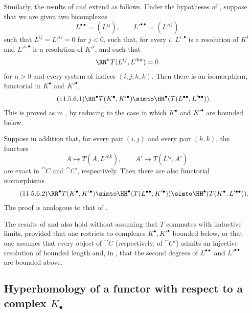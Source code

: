 \begin{env}[11.5.6]
\label{0.11.5.6}
Similarly, the results of  and  extend as follows.
Under the hypotheses of , suppose that we are given two bicomplexes
\[
  L^{\bullet\bullet}=(L^{ij}),\qquad
  L'^{\bullet\bullet}=(L'^{ij})
\]
such that $L^{ij}=L'^{ij}=0$ for $j<0$, such that, for every $i$, $L^{i,\bullet}$ is a resolution of $K^i$ and $L'^{i,\bullet}$ is a resolution of $K'^i$, and such that
\[
  \RR^nT(L^{ij},L'^{hk})=0
\]
for $n>0$ and every system of indices $(i,j,h,k)$.
Then there is an isomorphism, functorial in $K^\bullet$ and $K'^\bullet$,
\[
\label{0.11.5.6.1}
\tag{11.5.6.1}
  \RR^\bullet T(K^\bullet,K'^\bullet)
  \simto
  \HH^\bullet(T(L^{\bullet\bullet},L'^{\bullet\bullet})).
\]
This is proved as in , by reducing to the case in which $K^\bullet$ and $K'^\bullet$ are bounded below.

Suppose in addition that, for every pair $(i,j)$ and every pair $(h,k)$, the functors
\[
  A\longmapsto T(A,L'^{hk}),
  \qquad
  A'\longmapsto T(L^{ij},A')
\]
are exact in $\cat{C}$ and $\cat{C}'$, respectively.
Then there are also functorial isomorphisms
\[
\label{0.11.5.6.2}
\tag{11.5.6.2}
  \RR^\bullet T(K^\bullet,K'^\bullet)
  \simto
  \HH^\bullet(T(L^{\bullet\bullet},K'^\bullet))
  \simto
  \HH^\bullet(T(K^\bullet,L'^{\bullet\bullet})).
\]
The proof is analogous to that of .
\end{env}

\begin{env}[11.5.7]
\label{0.11.5.7}
The results of  and  also hold without assuming that $T$ commutes with inductive limits, provided that one restricts to complexes $K^\bullet,K'^\bullet$ bounded below, or that one assumes that every object of $\cat{C}$ (respectively, of $\cat{C}'$) admits an injective resolution of bounded length and, in , that the second degrees of $L^{\bullet\bullet}$ and $L'^{\bullet\bullet}$ are bounded above.
\end{env}

\subsection{Hyperhomology of a functor with respect to a complex $K_{\bullet}$}
\label{subsection:0.11.6}

